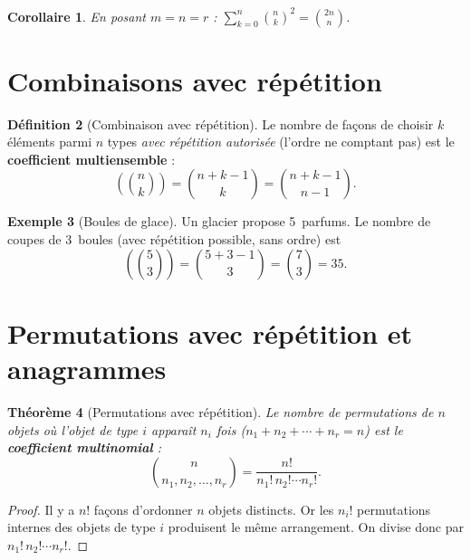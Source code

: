 \documentclass[12pt,a4paper,openany]{book}
\theoremstyle{definition}
\newtheorem{definition}{Définition}[chapter]
\newtheorem{exemple}[definition]{Exemple}
\theoremstyle{plain}
\newtheorem{theoreme}[definition]{Théorème}
\newtheorem{corollaire}[definition]{Corollaire}
\theoremstyle{remark}
\begin{document}
\begin{corollaire}\label{cor:vandermonde-cas-particulier}
En posant $m = n = r$ :
$\displaystyle\sum_{k=0}^{n}\binom{n}{k}^2 = \binom{2n}{n}$.
\end{corollaire}

\section{Combinaisons avec répétition}\label{sec:multiset}

\begin{definition}[Combinaison avec répétition]\label{def:combinaison-repetition}
Le nombre de façons de choisir $k$ éléments parmi $n$ types \emph{avec
répétition autorisée} (l'ordre ne comptant pas) est le
\textbf{coefficient multiensemble} :
\[
  \left(\!\!\binom{n}{k}\!\!\right)
  = \binom{n+k-1}{k}
  = \binom{n+k-1}{n-1}.
\]
\end{definition}

\begin{exemple}[Boules de glace]\label{ex:glaces}
Un glacier propose 5~parfums. Le nombre de coupes de 3~boules (avec
répétition possible, sans ordre) est
\[
  \left(\!\!\binom{5}{3}\!\!\right) = \binom{5+3-1}{3} = \binom{7}{3} = 35.
\]
\end{exemple}

\section{Permutations avec répétition et anagrammes}\label{sec:perm-repetition}

\begin{theoreme}[Permutations avec répétition]\label{thm:perm-repetition}
Le nombre de permutations de $n$ objets où l'objet de type $i$ apparaît
$n_i$ fois ($n_1 + n_2 + \cdots + n_r = n$) est le \textbf{coefficient
multinomial} :
\[
  \binom{n}{n_1, n_2, \ldots, n_r} = \frac{n!}{n_1!\, n_2! \cdots n_r!}.
\]
\end{theoreme}

\begin{proof}
Il y a $n!$ façons d'ordonner $n$ objets distincts. Or les $n_i!$
permutations internes des objets de type $i$ produisent le même arrangement.
On divise donc par $n_1!\, n_2! \cdots n_r!$.
\end{proof}
\end{document}
